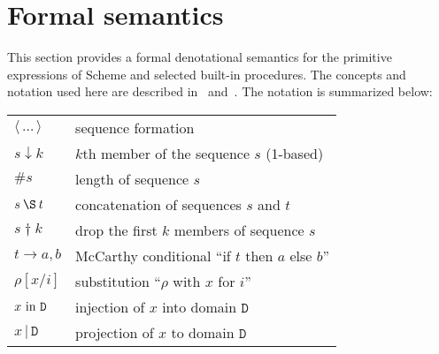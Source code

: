 \section{Formal semantics}
\label{formalsemanticssection}

\bgroup

\newcommand{\sembrack}[1]{[\![#1]\!]}
\newcommand{\fun}[1]{\hbox{\it #1}}
\newenvironment{semfun}{\begin{tabbing}$}{$\end{tabbing}}
\newcommand\LOC{{\tt{}L}}
\newcommand\NAT{{\tt{}N}}
\newcommand\TRU{{\tt{}T}}
\newcommand\SYM{{\tt{}Q}}
\newcommand\CHR{{\tt{}H}}
\newcommand\NUM{{\tt{}R}}
\newcommand\FUN{{\tt{}F}}
\newcommand\EXP{{\tt{}E}}
\newcommand\STV{{\tt{}E}}
\newcommand\STO{{\tt{}S}}
\newcommand\ENV{{\tt{}U}}
\newcommand\ANS{{\tt{}A}}
\newcommand\ERR{{\tt{}X}}
\newcommand\DP{\tt{P}}
\newcommand\EC{{\tt{}K}}
\newcommand\CC{{\tt{}C}}
\newcommand\MSC{{\tt{}M}}
\newcommand\PAI{\hbox{\EXP$_{\rm p}$}}
\newcommand\VEC{\hbox{\EXP$_{\rm v}$}}
\newcommand\STR{\hbox{\EXP$_{\rm s}$}}

\newcommand\elt{\downarrow}
\newcommand\drop{\dagger}

\newcommand{\wrong}[1]{\fun{wrong }\hbox{\rm``#1''}}
\newcommand{\go}[1]{\hbox{\hspace*{#1em}}}

This section provides a formal denotational semantics for the primitive
expressions of Scheme and selected built-in procedures.  The concepts
and notation used here are described in~\cite{Stoy77} and~\cite{Schmidt1997}.
The notation is summarized below:

\begin{tabular}{ll}
$\langle\,\ldots\,\rangle$ & sequence formation \\
$s \elt k$                 & $k$th member of the sequence $s$ (1-based) \\
$\#s$                      & length of sequence $s$ \\
$s \:\S\: t$               & concatenation of sequences $s$ and $t$ \\
$s \drop k$                & drop the first $k$ members of sequence $s$ \\
$t \rightarrow a, b$       & McCarthy conditional ``if $t$ then $a$ else $b$'' \\
$\rho[x/i]$                & substitution ``$\rho$ with $x$ for $i$'' \\
$x\hbox{ \rm in }{\texttt{D}}$         & injection of $x$ into domain $\texttt{D}$ \\
$x\,\vert\,\texttt{D}$       & projection of $x$ to domain $\texttt{D}$
\end{tabular}

